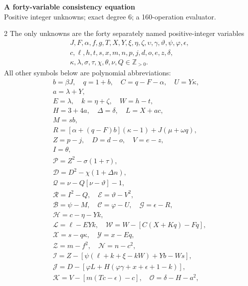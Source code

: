 \documentclass[10pt]{article}
\begin{document}
\begin{center}
{\large\bfseries A forty-variable consistency equation}\\[-1pt]
{\small Positive integer unknowns; exact degree 6; a 160-operation evaluator.}
\end{center}\vspace{-8pt}
\begin{multicols}{2}
\fontsize{8.6}{9.1}\selectfont
The only unknowns are the forty separately named positive-integer variables
\[
\begin{gathered}J,F,\alpha,f,g,T,X,Y,\xi,\eta,\zeta,\upsilon,\gamma,\vartheta,\psi,\varphi,\epsilon,\\
c,\ell,h,t,s,x,m,n,p,j,d,o,e,z,\delta,\\
\kappa,\lambda,\sigma,\tau,\chi,\theta,\nu,Q\in\mathbb Z_{>0}.\end{gathered}
\]
All other symbols below are polynomial abbreviations:
\[
\begin{gathered}
b=\beta J,\quad q=1+b,\quad C=q-F-\alpha,\quad U=Y\kappa,\\
a=\lambda+Y,\\
E=\lambda,\quad k=\eta+\zeta,\quad W=h-t,\\
H=3+4a,\quad\Delta=\delta,\quad L=X+ac,\\
M=sb,\\
R=[\alpha+(q-F)b](\kappa-1)+J(\mu+\omega q),\\
Z=p-j,\quad D=d-o,\quad V=e-z,\\
I=\theta,\\
\mathcal{P}=Z^2-\sigma(1+\tau),\\
\mathcal{D}=D^2-\chi(1+\Delta n),\\
\mathcal{Q}=\nu-Q[\nu-\vartheta]-1,\\
\mathcal{R}=I^2-Q,\quad \mathcal{E}=\vartheta-V^2,\\
\mathcal{B}=\psi-M,\quad \mathcal{C}=\varphi-U,\quad \mathcal{G}=\epsilon-R,\\
\mathcal{H}=c-\eta-Yk,\\
\mathcal{L}=\ell-EYk,\quad \mathcal{W}=W-[C(X+Kq)-Fq],\\
\mathcal{X}=s-q\kappa,\quad \mathcal{Y}=x-Eq,\\
\mathcal{Z}=m-f^2,\quad \mathcal{N}=n-c^2,\\
\mathcal{I}=Z-[\psi(\ell+k+\xi-kW)+Yb-Ws],\\
\mathcal{J}=D-[\varphi L+H(\varphi\gamma+x+\epsilon+1-k)],\\
\mathcal{K}=V-[m(Tc-\epsilon)-c],\quad\mathcal{O}=\delta-H-a^2,\\

\end{gathered}\]
\end{multicols}
\end{document}
